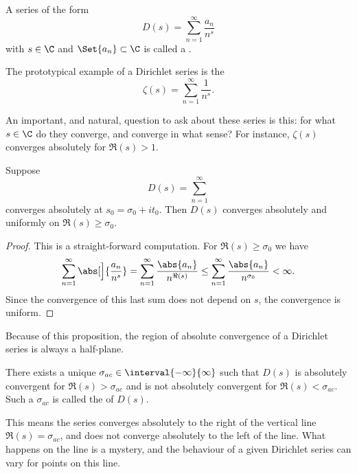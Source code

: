 
\begin{definition}
	A series of the form
	\[
		D(s) = \sum_{n = 1}^\infty \frac{a_n}{n^s}
	\]
	with $s \in \C$ and $\Set{a_n} \subset \C$ is called a .
\end{definition}

\begin{example}
	The prototypical example of a Dirichlet series is the 
	\[
		\zeta(s) = \sum_{n = 1}^\infty \frac{1}{n^s}.
	\]
\end{example}

An important, and natural, question to ask about these series is this: for what $s \in \C$ do they converge, and converge in what sense?
For instance, $\zeta(s)$ converges absolutely for $\Re(s) > 1$.

\begin{proposition}\label{prop12.1}
	Suppose
	\[
		D(s) = \sum_{n = 1}^\infty
	\]
	converges absolutely at $s_0 = \sigma_0 + i t_0$.
	Then $D(s)$ converges absolutely and uniformly on $\Re(s) \geq \sigma_0$.
\end{proposition}

\begin{proof}
	This is a straight-forward computation.
	For $\Re(s) \geq \sigma_0$ we have
	\[
		\sum_{n = 1}^\infty \abs[\Big]{\frac{a_n}{n^s}} = \sum_{n = 1}^\infty \frac{\abs{a_n}}{n^{\Re(s)}} \leq \sum_{n = 1}^\infty \frac{\abs{a_n}}{n^{\sigma_0}} < \infty.
	\]
	Since the convergence of this last sum does not depend on $s$, the convergence is uniform.
\end{proof}

\begin{remark}
	\begin{items}
		\item Because of this proposition, the region of absolute convergence of a Dirichlet series is always a half-plane.
		\item There exists a unique $\sigma_{ac} \in \interval{-\infty}{\infty}$ such that $D(s)$ is absolutely convergent for $\Re(s) > \sigma_{ac}$ and is not absolutely convergent for $\Re(s) < \sigma_{ac}$.
		Such a $\sigma_{ac}$ is called the  of $D(s)$.

		This means the series converges absolutely to the right of the vertical line $\Re(s) = \sigma_{ac}$, and does not converge absolutely to the left of the line.
		What happens on the line is a mystery, and the behaviour of a given Dirichlet series can vary for points on this line.
	\end{items}
\end{remark}


